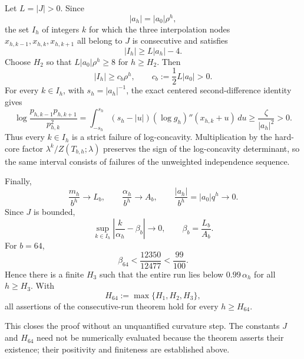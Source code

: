 Let \(L=|J|>0\).  Since
\[
|a_h|=|a_0|\rho^h,
\]
the set \(I_h\) of integers \(k\) for which the three interpolation nodes
\(x_{h,k-1},x_{h,k},x_{h,k+1}\) all belong to \(J\) is consecutive and satisfies
\[
|I_h|\ge L|a_h|-4.
\]
Choose \(H_2\) so that \(L|a_0|\rho^h\ge8\) for \(h\ge H_2\).  Then
\[
\boxed{|I_h|\ge c_b\rho^h},
\qquad
c_b:=\frac12L|a_0|>0.
\]
For every \(k\in I_h\), with \(s_h=|a_h|^{-1}\), the exact centered
second-difference identity gives
\[
\log\frac{p_{h,k-1}p_{h,k+1}}{p_{h,k}^2}
=
\int_{-s_h}^{s_h}
 (s_h-|u|)(\log g_h)''(x_{h,k}+u)\,du
\ge
\frac{\zeta}{|a_h|^2}>0.
\]
Thus every \(k\in I_h\) is a strict failure of log-concavity.  Multiplication
by the hard-core factor \(\lambda^k/Z(T_{b,h};\lambda)\) preserves the sign of
the log-concavity determinant, so the same interval consists of failures of
the unweighted independence sequence.

Finally,
\[
\frac{m_h}{b^h}\to L_b,\qquad
\frac{\alpha_h}{b^h}\to A_b,\qquad
\frac{|a_h|}{b^h}=|a_0|q^h\to0.
\]
Since \(J\) is bounded,
\[
\sup_{k\in I_h}\left|\frac{k}{\alpha_h}-\beta_b\right|\to0,
\qquad
\beta_b=\frac{L_b}{A_b}.
\]
For \(b=64\),
\[
\beta_{64}
<
\frac{12350}{12477}
<
\frac{99}{100}.
\]
Hence there is a finite \(H_3\) such that the entire run lies below
\(0.99\,\alpha_h\) for all \(h\ge H_3\).  With
\[
H_{64}:=\max\{H_1,H_2,H_3\},
\]
all assertions of the consecutive-run theorem hold for every
\(h\ge H_{64}\).

This closes the proof without an unquantified curvature step.  The constants
\(J\) and \(H_{64}\) need not be numerically evaluated because the theorem
asserts their existence; their positivity and finiteness are established
above.

